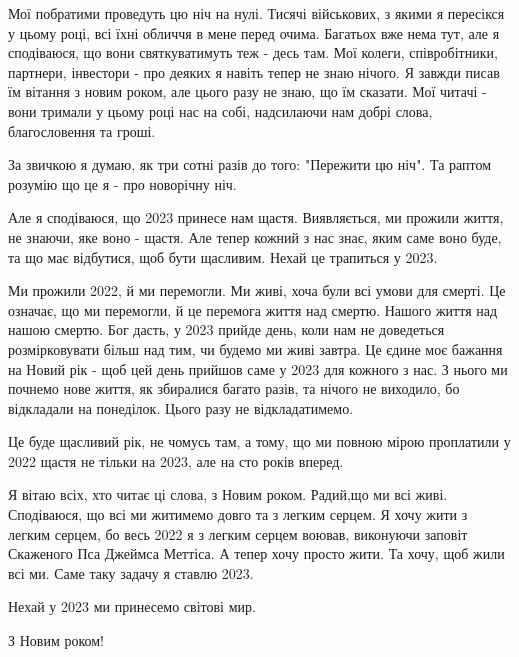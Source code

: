 Мої побратими проведуть цю ніч на нулі. Тисячі військових, з якими я пересікся
у цьому році, всі їхні обличчя в мене перед очима. Багатьох вже нема тут, але я
сподіваюся, що вони святкуватимуть теж - десь там. Мої колеги, співробітники,
партнери, інвестори - про деяких я навіть тепер не знаю нічого. Я завжди писав
їм вітання з новим роком, але цього разу не знаю, що їм сказати. Мої читачі -
вони тримали у цьому році нас на собі, надсилаючи нам добрі слова,
благословення та гроші.  

За звичкою я думаю, як три сотні разів до того: "Пережити цю ніч". Та раптом
розумію що це я  - про новорічну ніч.

Але я сподіваюся, що 2023 принесе нам щастя. Виявляється, ми прожили життя, не
знаючи, яке воно - щастя.  Але тепер кожний з нас знає, яким саме воно буде, та
що має відбутися, щоб бути щасливим. Нехай це трапиться у 2023.

Ми прожили 2022, й ми перемогли. Ми живі, хоча були всі умови для смерті. Це
означає, що ми перемогли, й це перемога життя над смертю. Нашого життя над
нашою смертю. Бог дасть, у 2023 прийде день, коли нам не доведеться
розмірковувати більш над тим, чи будемо ми живі завтра. Це єдине моє бажання на
Новий рік - щоб цей день прийшов саме у 2023 для кожного з нас. З нього ми
почнемо нове життя, як збиралися багато разів, та нічого не виходило, бо
відкладали на понеділок. Цього разу не відкладатимемо.

Це буде щасливий рік, не чомусь там, а тому, що ми повною мірою проплатили у
2022 щастя не тільки на 2023, але на сто років вперед. 

Я вітаю всіх, хто читає ці слова, з Новим роком. Радий,що ми всі живі.
Сподіваюся, що всі ми житимемо довго та з легким серцем. Я хочу жити з легким
серцем, бо весь 2022 я з легким серцем воював, виконуючи заповіт Скаженого Пса
Джеймса Меттіса. А тепер хочу просто жити. Та хочу, щоб жили всі ми. Саме таку
задачу я ставлю 2023.

Нехай у 2023 ми принесемо світові мир.

З Новим роком!
